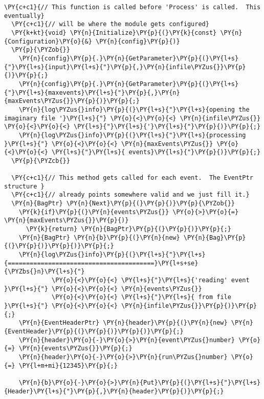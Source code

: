 \begin{Verbatim}[commandchars=\\\{\}]
  \PY{c+c1}{// This function is called before 'Process' is called.  This eventually}
  \PY{c+c1}{// will be where the module gets configured}
  \PY{k+kt}{void} \PY{n}{Initialize}\PY{p}{(}\PY{k}{const} \PY{n}{Configuration}\PY{o}{&} \PY{n}{config}\PY{p}{)}
  \PY{p}{\PYZob{}}
    \PY{n}{config}\PY{p}{.}\PY{n}{GetParameter}\PY{p}{(}\PY{l+s}{"}\PY{l+s}{input}\PY{l+s}{"}\PY{p}{,}\PY{n}{infile\PYZus{}}\PY{p}{)}\PY{p}{;}
    \PY{n}{config}\PY{p}{.}\PY{n}{GetParameter}\PY{p}{(}\PY{l+s}{"}\PY{l+s}{maxevents}\PY{l+s}{"}\PY{p}{,}\PY{n}{maxEvents\PYZus{}}\PY{p}{)}\PY{p}{;}
    \PY{n}{log\PYZus{}info}\PY{p}{(}\PY{l+s}{"}\PY{l+s}{opening the imaginary file '}\PY{l+s}{"} \PY{o}{<}\PY{o}{<} \PY{n}{infile\PYZus{}} \PY{o}{<}\PY{o}{<} \PY{l+s}{"}\PY{l+s}{'}\PY{l+s}{"}\PY{p}{)}\PY{p}{;}
    \PY{n}{log\PYZus{}info}\PY{p}{(}\PY{l+s}{"}\PY{l+s}{processing }\PY{l+s}{"} \PY{o}{<}\PY{o}{<} \PY{n}{maxEvents\PYZus{}} \PY{o}{<}\PY{o}{<} \PY{l+s}{"}\PY{l+s}{ events}\PY{l+s}{"}\PY{p}{)}\PY{p}{;}
  \PY{p}{\PYZcb{}}

  \PY{c+c1}{// This method gets called for each event.  The EventPtr structure }
  \PY{c+c1}{// already points somewhere valid and we just fill it.}
  \PY{n}{BagPtr} \PY{n}{Next}\PY{p}{(}\PY{p}{)}\PY{p}{\PYZob{}}
    \PY{k}{if}\PY{p}{(}\PY{n}{events\PYZus{}} \PY{o}{>}\PY{o}{=} \PY{n}{maxEvents\PYZus{}}\PY{p}{)}
      \PY{k}{return} \PY{n}{BagPtr}\PY{p}{(}\PY{p}{)}\PY{p}{;}
    \PY{n}{BagPtr} \PY{n}{b}\PY{p}{(}\PY{n}{new} \PY{n}{Bag}\PY{p}{(}\PY{p}{)}\PY{p}{)}\PY{p}{;}
    \PY{n}{log\PYZus{}info}\PY{p}{(}\PY{l+s}{"}\PY{l+s}{========================================}\PY{l+s+se}{\PYZbs{}n}\PY{l+s}{"}
             \PY{o}{<}\PY{o}{<} \PY{l+s}{"}\PY{l+s}{'reading' event }\PY{l+s}{"} \PY{o}{<}\PY{o}{<} \PY{n}{events\PYZus{}} 
             \PY{o}{<}\PY{o}{<} \PY{l+s}{"}\PY{l+s}{ from file }\PY{l+s}{"} \PY{o}{<}\PY{o}{<} \PY{n}{infile\PYZus{}}\PY{p}{)}\PY{p}{;} 
    \PY{n}{EventHeaderPtr} \PY{n}{header}\PY{p}{(}\PY{n}{new} \PY{n}{EventHeader}\PY{p}{(}\PY{p}{)}\PY{p}{)}\PY{p}{;}
    \PY{n}{header}\PY{o}{-}\PY{o}{>}\PY{n}{event\PYZus{}number} \PY{o}{=} \PY{n}{events\PYZus{}}\PY{p}{;}
    \PY{n}{header}\PY{o}{-}\PY{o}{>}\PY{n}{run\PYZus{}number} \PY{o}{=} \PY{l+m+mi}{12345}\PY{p}{;} 

    \PY{n}{b}\PY{o}{-}\PY{o}{>}\PY{n}{Put}\PY{p}{(}\PY{l+s}{"}\PY{l+s}{Header}\PY{l+s}{"}\PY{p}{,}\PY{n}{header}\PY{p}{)}\PY{p}{;}


\end{Verbatim}
